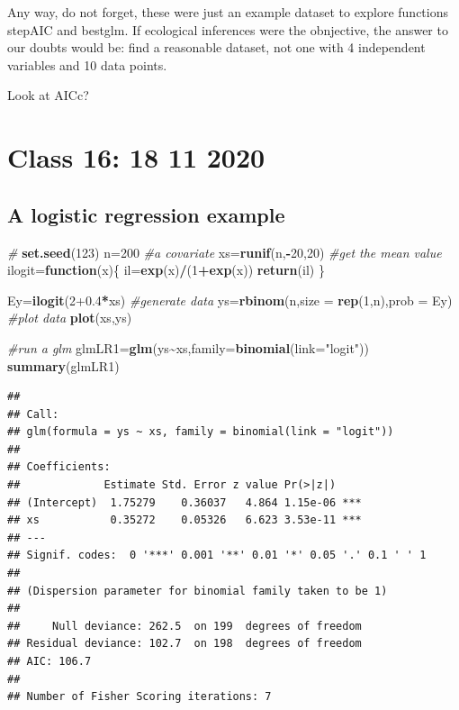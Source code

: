 \documentclass[
]{book}
\newenvironment{Shaded}{\begin{snugshade}}{\end{snugshade}}
\newcommand{\AttributeTok}[1]{\textcolor[rgb]{0.13,0.29,0.53}{#1}}
\newcommand{\CommentTok}[1]{\textcolor[rgb]{0.56,0.35,0.01}{\textit{#1}}}
\newcommand{\ControlFlowTok}[1]{\textcolor[rgb]{0.13,0.29,0.53}{\textbf{#1}}}
\newcommand{\DecValTok}[1]{\textcolor[rgb]{0.00,0.00,0.81}{#1}}
\newcommand{\FloatTok}[1]{\textcolor[rgb]{0.00,0.00,0.81}{#1}}
\newcommand{\FunctionTok}[1]{\textcolor[rgb]{0.13,0.29,0.53}{\textbf{#1}}}
\newcommand{\NormalTok}[1]{#1}
\newcommand{\OtherTok}[1]{\textcolor[rgb]{0.56,0.35,0.01}{#1}}
\newcommand{\SpecialCharTok}[1]{\textcolor[rgb]{0.81,0.36,0.00}{\textbf{#1}}}
\newcommand{\StringTok}[1]{\textcolor[rgb]{0.31,0.60,0.02}{#1}}
\begin{document}
Any way, do not forget, these were just an example dataset to explore functions stepAIC and bestglm. If ecological inferences were the obnjective, the answer to our doubts would be: find a reasonable dataset, not one with 4 independent variables and 10 data points.

Look at AICc?

\hypertarget{aula16}{%
\chapter{Class 16: 18 11 2020}\label{aula16}}

\hypertarget{a-logistic-regression-example}{%
\section{A logistic regression example}\label{a-logistic-regression-example}}

\begin{Shaded}
\begin{Highlighting}[]
\CommentTok{\#}
\FunctionTok{set.seed}\NormalTok{(}\DecValTok{123}\NormalTok{)}
\NormalTok{n}\OtherTok{=}\DecValTok{200}
\CommentTok{\#a covariate}
\NormalTok{xs}\OtherTok{=}\FunctionTok{runif}\NormalTok{(n,}\SpecialCharTok{{-}}\DecValTok{20}\NormalTok{,}\DecValTok{20}\NormalTok{)}
\CommentTok{\#get the mean value}
\NormalTok{ilogit}\OtherTok{=}\ControlFlowTok{function}\NormalTok{(x)\{}
\NormalTok{  il}\OtherTok{=}\FunctionTok{exp}\NormalTok{(x)}\SpecialCharTok{/}\NormalTok{(}\DecValTok{1}\SpecialCharTok{+}\FunctionTok{exp}\NormalTok{(x))}
\FunctionTok{return}\NormalTok{(il)}
\NormalTok{\}}

\NormalTok{Ey}\OtherTok{=}\FunctionTok{ilogit}\NormalTok{(}\DecValTok{2}\FloatTok{+0.4}\SpecialCharTok{*}\NormalTok{xs)}
\CommentTok{\#generate data}
\NormalTok{ys}\OtherTok{=}\FunctionTok{rbinom}\NormalTok{(n,}\AttributeTok{size =} \FunctionTok{rep}\NormalTok{(}\DecValTok{1}\NormalTok{,n),}\AttributeTok{prob =}\NormalTok{ Ey)}
\CommentTok{\#plot data}
\FunctionTok{plot}\NormalTok{(xs,ys)}


\CommentTok{\#run a glm}
\NormalTok{glmLR1}\OtherTok{=}\FunctionTok{glm}\NormalTok{(ys}\SpecialCharTok{\textasciitilde{}}\NormalTok{xs,}\AttributeTok{family=}\FunctionTok{binomial}\NormalTok{(}\AttributeTok{link=}\StringTok{"logit"}\NormalTok{))}
\FunctionTok{summary}\NormalTok{(glmLR1)}
\end{Highlighting}
\end{Shaded}

\begin{verbatim}
## 
## Call:
## glm(formula = ys ~ xs, family = binomial(link = "logit"))
## 
## Coefficients:
##             Estimate Std. Error z value Pr(>|z|)    
## (Intercept)  1.75279    0.36037   4.864 1.15e-06 ***
## xs           0.35272    0.05326   6.623 3.53e-11 ***
## ---
## Signif. codes:  0 '***' 0.001 '**' 0.01 '*' 0.05 '.' 0.1 ' ' 1
## 
## (Dispersion parameter for binomial family taken to be 1)
## 
##     Null deviance: 262.5  on 199  degrees of freedom
## Residual deviance: 102.7  on 198  degrees of freedom
## AIC: 106.7
## 
## Number of Fisher Scoring iterations: 7
\end{verbatim}
\end{document}
